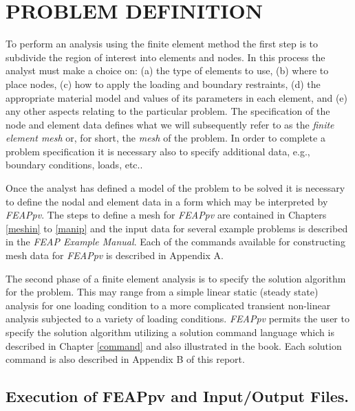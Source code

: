 \chapter[Problem Definition]{PROBLEM DEFINITION}
\label{def}

To perform an analysis using the finite element method the first step is
to subdivide the region of interest into elements and nodes.  In this
process the analyst must make a choice on: (a) the type of elements to
use, (b) where to place nodes, (c) how to apply the loading and
boundary restraints, (d) the appropriate material model
and values of its parameters in each element, and (e) any other aspects
relating to the particular problem.  The specification of the node and
element data defines what we will subsequently refer to as the
{\it finite element mesh} or, for short, the {\it mesh} of the problem.  
In order to complete a problem specification it is necessary also to
specify additional data, e.g., boundary conditions, loads, etc..

Once the analyst has defined a model of the problem to be solved it is 
necessary to  define the nodal and element data in a form
which may be interpreted by {\sl FEAPpv}.  The steps to define 
a mesh for {\sl FEAPpv}
are contained in Chapters \ref{meshin} to \ref{manip}
and the input data for several
example problems is described in the {\sl FEAP Example Manual}.
Each of the commands available for constructing mesh data for \textsl{FEAPpv}
is described in Appendix A.

The second phase of a finite element analysis is to specify the 
solution algorithm for the problem.  This may range from a simple
linear static (steady state)
analysis for one loading condition to a more complicated transient
non-linear analysis subjected to a variety of loading conditions.  {\sl FEAPpv}
permits the user to specify the solution algorithm utilizing
a solution command language which is described in Chapter \ref{command} and
also illustrated in the book.
Each solution command is also described in Appendix B of this report.

\section{Execution of FEAPpv and Input/Output Files.}

